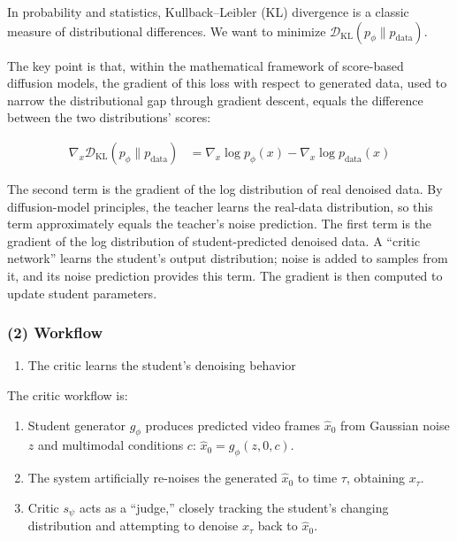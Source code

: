 In probability and statistics, Kullback--Leibler (KL) divergence is a classic measure of distributional differences. We want to minimize \(\mathcal{D}_{\mathrm{KL}}(p_\phi\|p_{\mathrm{data}})\).

The key point is that, within the mathematical framework of score-based diffusion models, the gradient of this loss with respect to generated data, used to narrow the distributional gap through gradient descent, equals the difference between the two distributions' scores:

\[
\begin{aligned}
\nabla_x\mathcal{D}_{\mathrm{KL}}(p_\phi\|p_{\mathrm{data}})
&=\nabla_x\log p_\phi(x)-\nabla_x\log p_{\mathrm{data}}(x)
\end{aligned}
\]

The second term is the gradient of the log distribution of real denoised data. By diffusion-model principles, the teacher learns the real-data distribution, so this term approximately equals the teacher's noise prediction. The first term is the gradient of the log distribution of student-predicted denoised data. A ``critic network'' learns the student's output distribution; noise is added to samples from it, and its noise prediction provides this term. The gradient is then computed to update student parameters.

\hypertarget{workflow-1}{%
\subsubsection{(2) Workflow}\label{workflow-1}}

\begin{enumerate}
\def\labelenumi{\arabic{enumi}.}
\tightlist
\item
  The critic learns the student's denoising behavior
\end{enumerate}

The critic workflow is:

\begin{enumerate}
\def\labelenumi{\arabic{enumi}.}
\tightlist
\item
  Student generator \(g_\phi\) produces predicted video frames \(\hat{x}_0\) from Gaussian noise \(z\) and multimodal conditions \(c\): \(\hat{x}_0=g_\phi(z,0,c)\).
\item
  The system artificially re-noises the generated \(\hat{x}_0\) to time \(\tau\), obtaining \(x_\tau\).
\item
  Critic \(s_\psi\) acts as a ``judge,'' closely tracking the student's changing distribution and attempting to denoise \(x_\tau\) back to \(\hat{x}_0\).
\end{enumerate}

